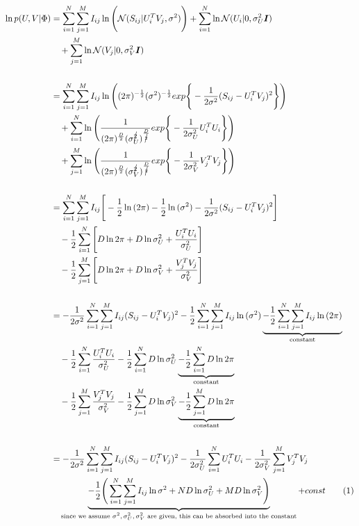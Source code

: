 \begin{align*}
\ln{p(U,V|\Phi)} &= \sum_{i=1}^{N}\sum_{j=1}^{M} I_{ij}\ln{\Bigg(\mathcal{N}(S_{ij}|U^{T}_{i}V_{j},\sigma^{2})\Bigg)} + \sum_{i=1}^{N}\ln{\mathcal{N}(U_{i}|0,\sigma_{U}^{2}\boldsymbol{I})} \\&\quad 
+ \sum_{j=1}^{M}\ln{\mathcal{N}(V_{j}|0,\sigma_{V}^{2}\boldsymbol{I})}\\
&\\
&= \sum_{i=1}^{N}\sum_{j=1}^{M} I_{ij}\ln{\Bigg( (2\pi)^{-\frac{1}{2}}(\sigma^{2})^{-\frac{1}{2}} exp\Bigg\{-\frac{1}{2\sigma^{2}}(S_{ij} - U_{i}^{T}V_{j})^{2} \Bigg\}  \Bigg)} \\&\quad
+ \sum_{i=1}^{N} \ln{ \Bigg( \frac{1}{(2\pi)^{\frac{D}{2}}(\sigma_{U}^{\cancel{2}})^{\frac{D}{\cancel{2}}}} exp\Bigg\{ -\frac{1}{2\sigma_{U}^{2}} U_{i}^{T}U_{i} \Bigg\} \Bigg) } \\&\quad
+ \sum_{j=1}^{M} \ln{ \Bigg( \frac{1}{(2\pi)^{\frac{D}{2}}(\sigma_{V}^{\cancel{2}})^{\frac{D}{\cancel{2}}}} exp\Bigg\{ -\frac{1}{2\sigma_{V}^{2}} V_{j}^{T}V_{j} \Bigg\} \Bigg) }\\
&\\
&= \sum_{i=1}^{N}\sum_{j=1}^{M} I_{ij}\Bigg[-\frac{1}{2}\ln{(2\pi)} -\frac{1}{2}\ln{(\sigma^{2}) -\frac{1}{2\sigma^{2}}(S_{ij} - U_{i}^{T}V_{j})^{2}\Bigg]} \\&\quad
-\frac{1}{2} \sum_{i=1}^{N}\Bigg[ D\ln{2\pi} + D\ln{\sigma_{U}^{2}} + \frac{U_{i}^{T}U_{i}}{\sigma_{U}^{2}} \Bigg] \\&\quad
-\frac{1}{2} \sum_{j=1}^{M}\Bigg[ D\ln{2\pi} + D\ln{\sigma_{V}^{2}} + \frac{V_{j}^{T}V_{j}}{\sigma_{V}^{2}} \Bigg] \\
\\
&= -\frac{1}{2\sigma^{2}}\sum_{i=1}^{N}\sum_{j=1}^{M} I_{ij}(S_{ij} - U_{i}^{T}V_{j})^{2} -\frac{1}{2}\sum_{i=1}^{N}\sum_{j=1}^{M} I_{ij}\ln{(\sigma^{2})} \underbrace{-\frac{1}{2}\sum_{i=1}^{N}\sum_{j=1}^{M} I_{ij}\ln{(2\pi)}}_\text{constant} \\&\quad
-\frac{1}{2} \sum_{i=1}^{N}  \frac{U_{i}^{T}U_{i}}{\sigma_{U}^{2}} -\frac{1}{2} \sum_{i=1}^{N} D\ln{\sigma_{U}^{2}} \underbrace{-\frac{1}{2} \sum_{i=1}^{N} D\ln{2\pi}}_\text{constant} \\&\quad
-\frac{1}{2} \sum_{j=1}^{M}  \frac{V_{j}^{T}V_{j}}{\sigma_{V}^{2}} -\frac{1}{2} \sum_{j=1}^{M} D\ln{\sigma_{V}^{2}} \underbrace{-\frac{1}{2} \sum_{j=1}^{M} D\ln{2\pi}}_\text{constant}\\
\\
&= -\frac{1}{2\sigma^{2}}\sum_{i=1}^{N}\sum_{j=1}^{M} I_{ij}(S_{ij} - U_{i}^{T}V_{j})^{2} - \frac{1}{2\sigma_{U}^{2}} \sum_{i=1}^{N} U_{i}^{T}U_{i} -\frac{1}{2\sigma_{V}^{2}} \sum_{j=1}^{M} V_{j}^{T}V_{j} \\&\quad
\underbrace{-\frac{1}{2}\Bigg( \sum_{i=1}^{N}\sum_{j=1}^{M} I_{ij}\ln{\sigma^{2}} + ND\ln{\sigma_{U}^2} + MD\ln{\sigma_{V}^2}\Bigg)}_\text{since we assume $\sigma^{2},\sigma_{U}^{2},\sigma_{V}^{2}$ are given, this can be absorbed into the constant} + const\tag{\stepcounter{equation}\theequation}
\end{align*}

